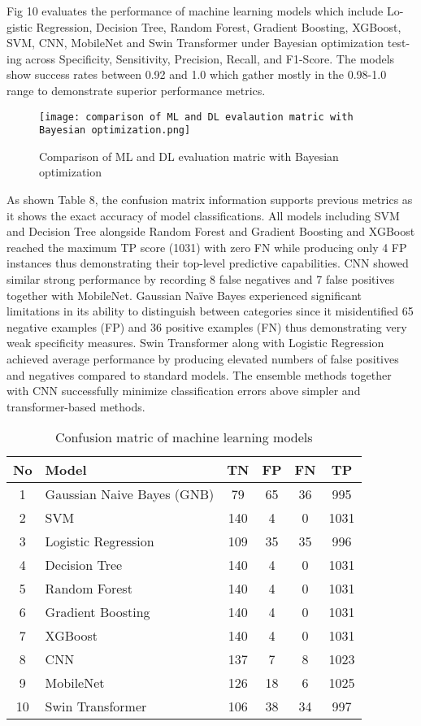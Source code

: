 \documentclass[runningheads]{llncs}
\begin{document}
Fig 10 evaluates the performance of machine learning models which include Lo-gistic Regression, Decision Tree, Random Forest, Gradient Boosting, XGBoost, SVM, CNN, MobileNet and Swin Transformer under Bayesian optimization test-ing across Specificity, Sensitivity, Precision, Recall, and F1-Score. The models show success rates between 0.92 and 1.0 which gather mostly in the 0.98-1.0 range to demonstrate superior performance metrics.

\begin{figure}
    \centering
    \texttt{[image: comparison of ML and DL evalaution matric with Bayesian optimization.png]}
    \caption{Comparison of ML and DL evaluation matric with Bayesian optimization}
    \label{fig:enter-label}
\end{figure}

As shown Table 8, the confusion matrix information supports previous metrics as it shows the exact accuracy of model classifications. All models including SVM and Decision Tree alongside Random Forest and Gradient Boosting and XGBoost reached the maximum TP score (1031) with zero FN while producing only 4 FP instances thus demonstrating their top-level predictive capabilities. CNN showed similar strong performance by recording 8 false negatives and 7 false positives together with MobileNet. Gaussian Naïve Bayes experienced significant limitations in its ability to distinguish between categories since it misidentified 65 negative examples (FP) and 36 positive examples (FN) thus demonstrating very weak specificity measures. Swin Transformer along with Logistic Regression achieved average performance by producing elevated numbers of false positives and negatives compared to standard models. The ensemble methods together with CNN successfully minimize classification errors above simpler and transformer-based methods.   

\begin{table}[ht]
\caption{Confusion matric of machine learning models}
\centering
\begin{tabular}{|c|l|c|c|c|c|}
\hline
\textbf{No} & \textbf{Model} & \textbf{TN} & \textbf{FP} & \textbf{FN} & \textbf{TP} \\
\hline
1 & Gaussian Naive Bayes (GNB) & 79 & 65 & 36 & 995 \\
2 & SVM & 140 & 4 & 0 & 1031 \\
3 & Logistic Regression & 109 & 35 & 35 & 996 \\
4 & Decision Tree & 140 & 4 & 0 & 1031 \\
5 & Random Forest & 140 & 4 & 0 & 1031 \\
6 & Gradient Boosting & 140 & 4 & 0 & 1031 \\
7 & XGBoost & 140 & 4 & 0 & 1031 \\
8 & CNN & 137 & 7 & 8 & 1023 \\
9 & MobileNet & 126 & 18 & 6 & 1025 \\
10 & Swin Transformer & 106 & 38 & 34 & 997 \\
\hline
\end{tabular}

\label{tab:confusion_matrix_components}
\end{table}
\end{document}
